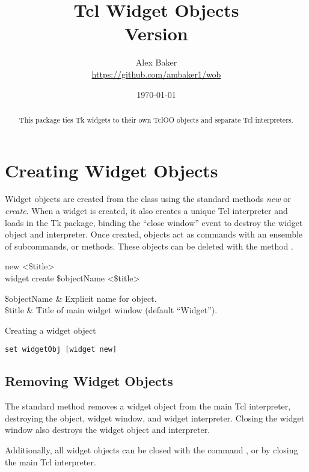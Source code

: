 \documentclass{article}
\title{\Huge Tcl Widget Objects\\\small Version \version}
\author{Alex Baker\\\small\url{https://github.com/ambaker1/wob}}
\date{\small\today}
\renewcommand{\^}[1]{\textsuperscript{#1}}
\renewcommand{\_}[1]{\textsubscript{#1}}
\begin{document}
\maketitle
\begin{abstract}
\begin{center}
This package ties Tk widgets to their own TclOO objects and separate Tcl interpreters.
\end{center}
\end{abstract}

\clearpage
\section{Creating Widget Objects}
Widget objects are created from the  class using the standard methods \textit{new} or \textit{create}. 
When a widget is created, it also creates a unique Tcl interpreter and loads in the Tk package, binding the ``close window'' event to destroy the widget object and interpreter.
Once created,  objects act as commands with an ensemble of subcommands, or methods. 
These objects can be deleted with the method .
\begin{syntax}
   	 new <\$title> \\
   	widget create \$objectName <\$title>
\end{syntax}
\begin{args}
   	\$objectName & Explicit name for object. \\
   	\$title & Title of main widget window (default ``Widget'').
\end{args}
\begin{example}{Creating a widget object}
\begin{lstlisting}
set widgetObj [widget new]
\end{lstlisting}
\end{example}
\subsection{Removing Widget Objects}
The standard method  removes a widget object from the main Tcl interpreter, destroying the object, widget window, and widget interpreter. 
Closing the widget window also destroys the widget object and interpreter.

\begin{syntax}
\end{syntax}
Additionally, all widget objects can be closed with the command , or by closing the main Tcl interpreter.
\begin{syntax}
\end{syntax}
\end{document}
